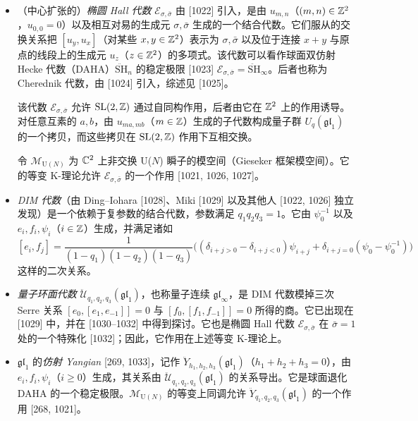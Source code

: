 \begin{itemize}[leftmargin=1.4em,itemsep=4pt]
  \item （中心扩张的）\emph{椭圆 Hall 代数} $\mathcal{E}_{\sigma,\bar\sigma}$ 由 [1022] 引入，是由 $u_{m,n}$（$(m,n)\in\mathbb{Z}^2$，$u_{0,0}=0$）以及相互对易的生成元 $\sigma,\bar\sigma$ 生成的一个结合代数。它们服从的交换关系把 $[u_y,u_x]$（对某些 $x,y\in\mathbb{Z}^2$）表示为 $\sigma,\bar\sigma$ 以及位于连接 $x+y$ 与原点的线段上的生成元 $u_z$（$z\in\mathbb{Z}^2$）的多项式。该代数可以看作球面双仿射 Hecke 代数（DAHA）$\ddot{\mathrm{SH}}_n$ 的稳定极限 [1023] $\mathcal{E}_{\sigma,\bar\sigma}=\ddot{\mathrm{SH}}_\infty$。后者也称为 Cherednik 代数，由 [1024] 引入，综述见 [1025]。

  该代数 $\mathcal{E}_{\sigma,\bar\sigma}$ 允许 $\mathrm{SL}(2,\mathbb{Z})$ 通过自同构作用，后者由它在 $\mathbb{Z}^2$ 上的作用诱导。对任意互素的 $a,b$，由 $u_{ma,mb}$（$m\in\mathbb{Z}$）生成的子代数构成量子群 $U_q(\mathfrak{gl}_1)$ 的一个拷贝，而这些拷贝在 $\mathrm{SL}(2,\mathbb{Z})$ 作用下互相交换。

  令 $\mathcal{M}_{\mathrm{U}(N)}$ 为 $\mathbb{C}^2$ 上非交换 U($N$) 瞬子的模空间（Gieseker 框架模空间）。它的等变 K-理论允许 $\mathcal{E}_{\sigma,\bar\sigma}$ 的一个作用 [1021, 1026, 1027]。

  \item \emph{DIM 代数}（由 Ding--Iohara [1028]、Miki [1029] 以及其他人 [1022, 1026] 独立发现）是一个依赖于复参数的结合代数，参数满足 $q_1q_2q_3=1$。它由 $\psi_0^{-1}$ 以及 $e_i,f_i,\psi_i$（$i\in\mathbb{Z}$）生成，并满足诸如
  \[
  [e_i,f_j]=\frac{1}{(1-q_1)(1-q_2)(1-q_3)}\Big((\delta_{i+j>0}-\delta_{i+j<0})\psi_{i+j}+\delta_{i+j=0}(\psi_0-\psi_0^{-1})\Big)
  \]
  这样的二次关系。

  \item \emph{量子环面代数} $\ddot{\mathcal U}_{q_1,q_2,q_3}(\mathfrak{gl}_1)$，也称量子连续 $\mathfrak{gl}_\infty$，是 DIM 代数模掉三次 Serre 关系 $[e_0,[e_1,e_{-1}]]=0$ 与 $[f_0,[f_1,f_{-1}]]=0$ 所得的商。它已出现在 [1029] 中，并在 [1030--1032] 中得到探讨。它也是椭圆 Hall 代数 $\mathcal{E}_{\sigma,\bar\sigma}$ 在 $\bar\sigma=1$ 处的一个特殊化 [1032]；因此，它作用在上述等变 K-理论上。

  \item $\mathfrak{gl}_1$ 的\emph{仿射 Yangian} [269, 1033]，记作 $\ddot Y_{h_1,h_2,h_3}(\mathfrak{gl}_1)$（$h_1+h_2+h_3=0$），由 $e_i,f_i,\psi_i$（$i\ge 0$）生成，其关系由 $\ddot{\mathcal U}_{q_1,q_2,q_3}(\mathfrak{gl}_1)$ 的关系导出。它是球面退化 DAHA 的一个稳定极限。$\mathcal{M}_{\mathrm{U}(N)}$ 的等变上同调允许 $\ddot Y_{q_1,q_2,q_3}(\mathfrak{gl}_1)$ 的一个作用 [268, 1021]。


\end{itemize}
